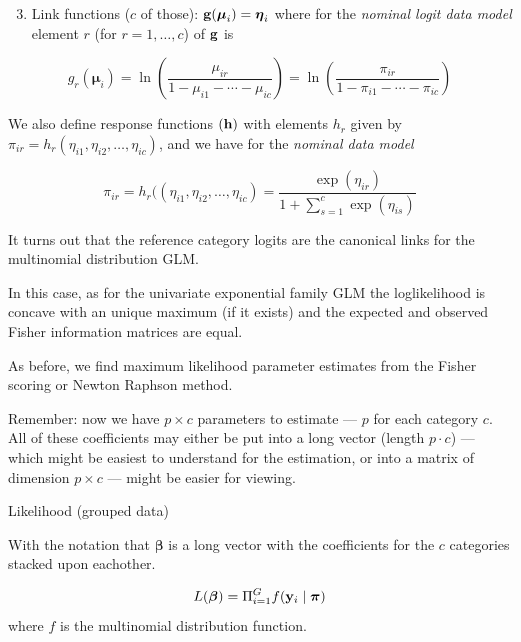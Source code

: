 \documentclass[
  ignorenonframetext,
]{beamer}
\providecommand{\tightlist}{%
  \setlength{\itemsep}{0pt}\setlength{\parskip}{0pt}}
\begin{document}
\begin{frame}
\begin{enumerate}
\setcounter{enumi}{2}
\tightlist
\item
  Link functions (\(c\) of those):
  \({\bf g}(\boldsymbol{\mu}_i)={\boldsymbol \eta}_i\) where for the
  \emph{nominal logit data model} element \(r\) (for \(r=1,\ldots, c\))
  of \({\bf g}\) is
\end{enumerate}

\[ g_{r}(\boldsymbol{\mu}_i)=\ln(\frac{\mu_{ir}}{1-\mu_{i1}-\cdots-\mu_{ic}})=
\ln(\frac{\pi_{ir}}{1-\pi_{i1}-\cdots-\pi_{ic}})\]

We also define response functions \((\bf h)\) with elements \(h_r\)
given by \(\pi_{ir}=h_r(\eta_{i1},\eta_{i2},\ldots,\eta_{ic})\), and we
have for the \emph{nominal data model}

\[\pi_{ir}=h_r((\eta_{i1},\eta_{i2},\ldots,\eta_{ic})=\frac{\exp(\eta_{ir})}{1+\sum_{s=1}^c \exp(\eta_{is})}\]
\end{frame}

\begin{frame}
It turns out that the reference category logits are the canonical links
for the multinomial distribution GLM.

In this case, as for the univariate exponential family GLM the
loglikelihood is concave with an unique maximum (if it exists) and the
expected and observed Fisher information matrices are equal.

As before, we find maximum likelihood parameter estimates from the
Fisher scoring or Newton Raphson method.

Remember: now we have \(p\times c\) parameters to estimate --- \(p\) for
each category \(c\). All of these coefficients may either be put into a
long vector (length \(p\cdot c\)) --- which might be easiest to
understand for the estimation, or into a matrix of dimension
\(p \times c\) --- might be easier for viewing.
\end{frame}

\begin{frame}
\begin{block}{Likelihood}
\protect\hypertarget{likelihood}{}
(grouped data)

With the notation that \({\boldsymbol \beta}\) is a long vector with the
coefficients for the \(c\) categories stacked upon eachother.

\[L({\boldsymbol \beta})=\Pi_{i=1}^G f({\bf y}_i\mid {\boldsymbol \pi})\]
where \(f\) is the multinomial distribution function.
\end{block}
\end{frame}
\end{document}
